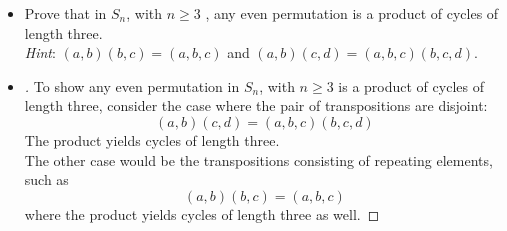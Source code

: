 \documentclass[paper=usletter, fontsize=12pt]{article}
\begin{document}
\begin{itemize}
\begin{itemize}
\begin{proof}[\unskip\nopunct]
\begin{align*}
\begin{tabular}{cccccc}
                        \end{tabular}
                    \right)\\
                    & = \left(
                        \begin{tabular}{cccccc}
                            1 & 2 & 3 & \ldots & m-1 & m \\
                            m & 2 & 3 & \ldots & m-1 & 1
                        \end{tabular}
                    \right)\\
                    & = (1,m) \qedhere
                \end{align*}
                \endgroup
            \end{proof}
            \vspace{0.2in}

            \item[\textbf{11}] Prove that in $S_n$, with $n \ge 3$ , any even
            permutation is a product of cycles of length three.\\
            \textit{Hint}: $(a,b)(b,c)=(a,b,c)$ and
            $(a,b)(c,d)=(a,b,c)(b,c,d)$.
            \item[\textbf{Ans}]
            \begin{proof}[\unskip\nopunct]
                To show any even permutation in $S_n$, with $n \ge 3$ is a product of cycles of length three, consider the case where the pair of transpositions are disjoint:
                \begin{equation*}
                    (a,b)(c,d) = (a,b,c)(b,c,d)
                \end{equation*}
                The product yields cycles of length three.\\
                The other case would be the transpositions consisting of repeating elements, such as
                \begin{equation*}
                    (a,b)(b,c)=(a,b,c)
                \end{equation*}
                where the product yields cycles of length three as well. \qedhere
            \end{proof}
            \vspace{0.2in}


\end{itemize}
\end{itemize}
\end{document}
